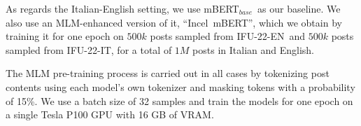 \documentclass[11pt]{article}
\newcommand{\dsENcorpus}{IFU-22-EN}
\newcommand{\dsITcorpus}{IFU-22-IT}
\newcommand{\mbert}{\mbox{mBERT$_{base}$}}
\newcommand{\imbert}{\mbox{Incel mBERT}}
\begin{document}
As regards the Italian-English setting, we use \mbert\, as our baseline. We also use an MLM-enhanced version of it, ``\imbert'', which we obtain by training it for one epoch on $500k$ posts sampled from \dsENcorpus\, and $500k$ posts sampled from \dsITcorpus, for a total of $1M$ posts in Italian and English.

The MLM pre-training process is carried out in all cases by tokenizing post contents using each model's own tokenizer and masking tokens with a probability of 15\%. We use a batch size of 32 samples and train the models for one epoch on a single Tesla P100 GPU with 16 GB of VRAM.
\end{document}
